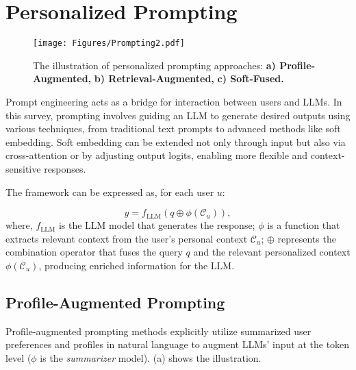 \section{Personalized Prompting}
\label{sec: personalized prompting}

\begin{figure*}[!t]
    \centering
    \texttt{[image: Figures/Prompting2.pdf]}
    \caption{The illustration of personalized prompting approaches: \textbf{a) Profile-Augmented,} \textbf{b) Retrieval-Augmented,} \textbf{c) Soft-Fused.} }
    \label{fig:prompting}
\vspace{-10pt}
\end{figure*}

Prompt engineering acts as a bridge for interaction between users and LLMs. In this survey, prompting involves guiding an LLM to generate desired outputs using various techniques, from traditional text prompts to advanced methods like soft embedding. Soft embedding can be extended not only through input but also via cross-attention or by adjusting output logits, enabling more flexible and context-sensitive responses.


The framework can be expressed as, for each user $u$:

\begin{equation}
y = f_{\text{LLM}} \left(q \oplus \phi\left(\mathcal{C}_u\right) \right),
\end{equation}
where, 
$f_{\text{LLM}}$ is the LLM model that generates the response;
$\phi$ is a function that extracts relevant context from the user's personal context $\mathcal{C}_u$;
$\oplus$ represents the combination operator that fuses the query $q$ and the relevant personalized context $\phi(\mathcal{C}_u)$, producing enriched information for the LLM.


\subsection{Profile-Augmented Prompting}
\label{subsec:PAG}

Profile-augmented prompting methods explicitly utilize summarized user preferences and profiles in natural language to augment LLMs’ input at the token level ($\phi$ is the \textit{summarizer} model).  (a) shows the illustration.



